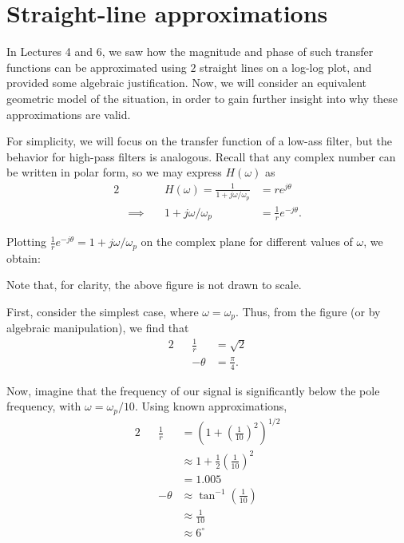 \documentclass[letterpaper]{article}
\theoremstyle{remark}
\newcommand{\eqn}[1]{\begin{alignat*}{2}#1\end{alignat*}}
\newcommand*{\thus}{&\implies\quad&}
\begin{document}
\section{Straight-line approximations}
In Lectures 4 and 6, we saw how the magnitude and phase of such transfer functions can be approximated using $2$ straight lines on a log-log plot, and provided some algebraic justification. Now, we will consider an equivalent geometric model of the situation, in order to gain further insight into why these approximations are valid.

For simplicity, we will focus on the transfer function of a low-ass filter, but the behavior for high-pass filters is analogous. Recall that any complex number can be written in polar form, so we may express $H(\omega)$ as
\eqn{
    && H(\omega) = \frac{1}{1 + j\omega / \omega_p} &= re^{j\theta} \\
    \thus 1 + j\omega / \omega_p &= \frac{1}{r} e^{-j\theta}.
}

Plotting $\frac{1}{r} e^{-j\theta} = 1 + j\omega / \omega_p$ on the complex plane for different values of $\omega$, we obtain:
\begin{center}
\end{center}
Note that, for clarity, the above figure is not drawn to scale.

First, consider the simplest case, where $\omega = \omega_p$. Thus, from the figure (or by algebraic manipulation), we find that
\eqn{
    && \frac{1}{r} &= \sqrt{2} \\
    && -\theta &= \frac{\pi}{4}.
}

Now, imagine that the frequency of our signal is significantly below the pole frequency, with $\omega = \omega_p / 10$. Using known approximations,
\eqn{
    && \frac{1}{r} &= \left(1 + \left(\frac{1}{10}\right)^2\right)^{1/2} \\
    &&&\approx 1 + \frac{1}{2} \left(\frac{1}{10} \right)^2 \\
    &&&= 1.005 \\
    && -\theta &\approx \tan^{-1}\left(\frac{1}{10}\right) \\
    &&&\approx \frac{1}{10} \\
    &&&\approx 6^{\circ}
}
\end{document}
